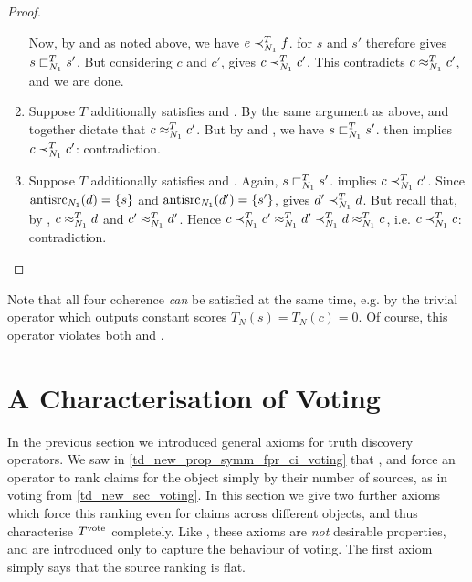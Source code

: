 \begin{proof}
\begin{enumerate}
              Now, by \freshposresp{} and \symmetry{} as noted above, we have
              $e \prec_{N_1}^T f$. \sourcecoherence{} for $s$ and $s'$ therefore
              gives $s \sqsubset_{N_1}^T s'$. But considering $c$ and $c'$,
              \claimcoherence{} gives $c \prec_{N_1}^T c'$. This contradicts $c
              \approx_{N_1}^T c'$, and we are done.

        \item Suppose $T$ additionally satisfies \sourceposresp{} and
              \conflictcoherence{}. By the same argument as above,
              \conflictcoherence{} and \symmetry{} together dictate that $c
              \approx_{N_1}^T c'$. But by \symmetry{} and \sourceposresp{}, we
              have $s \sqsubset_{N_1}^T s'$. \claimcoherence{} then implies $c
              \prec_{N_1}^T c'$: contradiction.

        \item Suppose $T$ additionally satisfies \sourceposresp{} and
              \anticoherence{}. Again, $s \sqsubset_{N_1}^T s'$. \claimcoherence{}
              implies $c \prec_{N_1}^T c'$. Since $\operatorname{antisrc}_{N_1}(d) = \{s\}$
              and $\operatorname{antisrc}_{N_1}(d') = \{s'\}$, \anticoherence{} gives $d'
              \prec_{N_1}^T d$. But recall that, by \symmetry{}, $c \approx_{N_1}^T
              d$ and $c' \approx_{N_1}^T d'$. Hence $c \prec_{N_1}^T c'
              \approx_{N_1}^T d' \prec_{N_1}^T d \approx_{N_1}^T c$, i.e. $c
              \prec_{N_1}^T c$: contradiction.
    \end{enumerate}
\end{proof}

Note that all four coherence \emph{can} be satisfied at the same time, e.g. by
the trivial operator which outputs constant scores $T_N(s) = T_N(c) = 0$. Of
course, this operator violates both \freshposresp{} and \sourceposresp{}.

\section{A Characterisation of Voting}
\label{td_new_sec_a_characterisation_of_voting}

In the previous section we introduced general axioms for truth discovery
operators. We saw in \cref{td_new_prop_symm_fpr_ci_voting} that \symmetry{},
\freshposresp{} and \classicalindependence{} force an operator to rank claims
for the object simply by their number of sources, as in voting from
\cref{td_new_sec_voting}. In this section we give two further axioms which
force this ranking even for claims across different objects, and thus
characterise $T^{\operatorname{vote}}{}$ completely. Like \classicalindependence{}, these
axioms are \emph{not} desirable properties, and are introduced only to capture
the behaviour of voting. The first axiom simply says that the source ranking is
flat.

